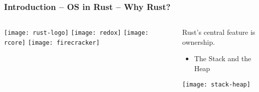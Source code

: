\begin{frame}[plain]
	\frametitle{Introduction -- OS in Rust -- Why Rust?}
	
	
	\begin{columns}
		
		\begin{column}{.2\textwidth}
			
			\texttt{[image: rust-logo]}
			\texttt{[image: redox]}
			\texttt{[image: rcore]}
			\texttt{[image: firecracker]}
		\end{column}
		
		\begin{column}{.8\textwidth}
			
						\Large
			
			Rust's central feature is ownership. 
			\begin{itemize}
			\item The Stack and the Heap
			\end{itemize}

			\texttt{[image: stack-heap]}
		\end{column}
		
		
	\end{columns}
	
	
\end{frame}

